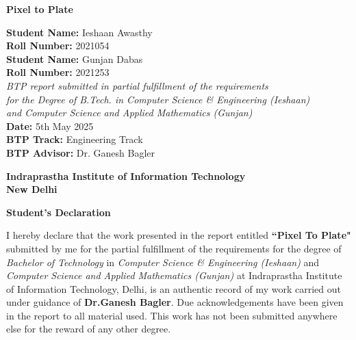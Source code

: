 \documentclass[letterpaper,11pt]{report}
\begin{document}


\newpage
\begin{titlepage}
    \centering
    \vspace*{3cm} %
    {\Huge\bfseries Pixel to Plate \par} %
    \vspace{3cm} %
    
    \large
    \textbf{Student Name:} Ieshaan Awasthy \\
    \textbf{Roll Number:} 2021054 \\[1cm]
    \textbf{Student Name:} Gunjan Dabas \\
    \textbf{Roll Number:} 2021253 \\[2cm]
    
\textit{BTP report submitted in partial fulfillment of the requirements \\ 
for the Degree of B.Tech. in Computer Science \& Engineering (Ieshaan) \\ 
and Computer Science and Applied Mathematics (Gunjan)} \\[0.5cm]

    \textbf{Date:} 5th May 2025 \\[1cm]
    \textbf{BTP Track:} Engineering Track \\[0.5cm]
    \textbf{BTP Advisor:} Dr. Ganesh Bagler \\
    
    \vfill %
    
    \textbf{Indraprastha Institute of Information Technology} \\
    \textbf{New Delhi}
\end{titlepage}





\begin{center}
\textbf{\Large Student's Declaration}\label{section:declaration}
\end{center}
I hereby declare that the work presented in the report entitled \textbf{``Pixel To Plate"} submitted by me for the partial fulfillment of the requirements for the degree of \emph{Bachelor of Technology} in \emph{Computer Science \& Engineering (Ieshaan)} and \emph{Computer Science and Applied Mathematics (Gunjan)} at
 Indraprastha Institute of Information Technology, Delhi, is an authentic record of my work carried out under guidance of \textbf{Dr.Ganesh Bagler}. Due acknowledgements have  been given in the report to all material used. This work has not been submitted anywhere else for the reward of any other degree.
 \\ \vspace{0.5in}
\end{document}
